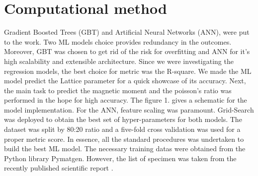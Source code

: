 \documentclass{article}
\begin{document}
\section{Computational method}
Gradient Boosted Trees (GBT) and Artificial Neural Networks (ANN), were put to the work. Two ML models choice provides redundancy in the outcomes. Moreover, GBT was chosen to get rid of the risk for overfitting and ANN for it's high scalability and extensible architecture. Since we were investigating the regression models, the best choice for metric was the R-square. We made the ML model predict the Lattice parameter for a quick showcase of its accuracy. Next, the main task to predict the magnetic moment and the poisson's ratio was performed in the hope for high accuracy. The figure 1. gives a schematic for the model implementation. For the ANN, feature scaling was paramount. Grid-Search was deployed to obtain the best set of hyper-parameters for both models. The dataset was split by 80:20 ratio and a five-fold cross validation was used for a proper metric score. In essence, all the standard procedures was undertaken to build the best ML model. The necessary training datas were obtained from the Python library Pymatgen\cite{ong2013python}. However, the list of specimen was taken from the recently published scientific report \cite{miyazaki2021machine}.



\end{document}
